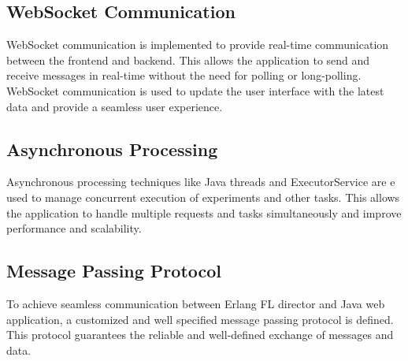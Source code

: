 \subsection*{WebSocket Communication}
WebSocket communication is implemented to provide real-time communication between the frontend and backend. This allows the application to send and receive messages in real-time without the need for polling or long-polling. WebSocket communication is used to update the user interface with the latest data and provide a seamless user experience.\\

\subsection*{Asynchronous Processing}
Asynchronous processing techniques like Java threads and ExecutorService are e used to manage concurrent execution of experiments and other tasks. This allows the application to handle multiple requests and tasks simultaneously and improve performance and scalability.\\

\subsection*{Message Passing Protocol}
To achieve seamless communication between Erlang FL director and Java web application, a customized and well specified message passing protocol is defined. This protocol guarantees the reliable and well-defined exchange of messages and data.
